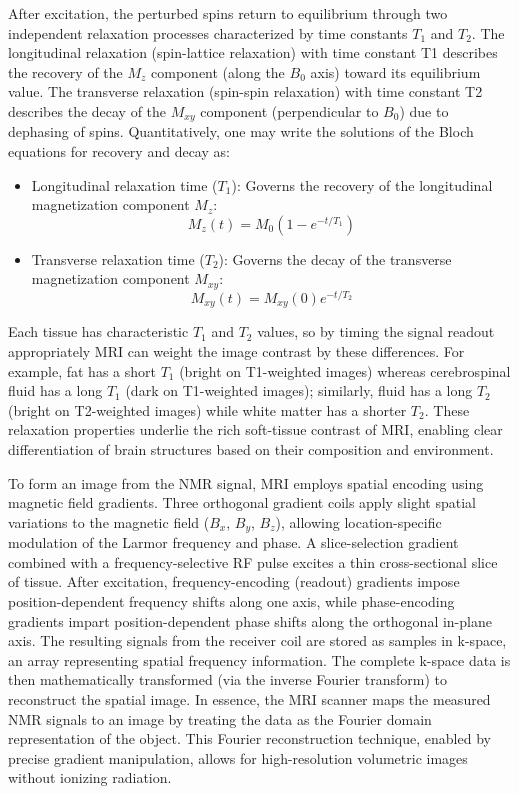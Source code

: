 After excitation, the perturbed spins return to equilibrium through two independent relaxation processes characterized by time constants $T_1$ and $T_2$. The longitudinal relaxation (spin-lattice relaxation) with time constant T1 describes the recovery of the $M_z$ component (along the $B_0$ axis) toward its equilibrium value. The transverse relaxation (spin-spin relaxation) with time constant T2 describes the decay of the $M_{xy}$ component (perpendicular to $B_0$) due to dephasing of spins. Quantitatively, one may write the solutions of the Bloch equations for recovery and decay as:
\begin{itemize}
    \item Longitudinal relaxation time (\(T_1\)): Governs the recovery of the longitudinal magnetization component \(M_z\):
    \begin{equation}
    M_z(t) = M_0 \left(1 - e^{-t/T_1}\right)
    \end{equation}
    
    \item Transverse relaxation time (\(T_2\)): Governs the decay of the transverse magnetization component \(M_{xy}\):
    \begin{equation}
    M_{xy}(t) = M_{xy}(0) e^{-t/T_2}
    \end{equation}
\end{itemize}
Each tissue has characteristic $T_1$ and $T_2$ values, so by timing the signal readout appropriately MRI can weight the image contrast by these differences. For example, fat has a short $T_1$ (bright on T1-weighted images) whereas cerebrospinal fluid has a long $T_1$ (dark on T1-weighted images); similarly, fluid has a long $T_2$ (bright on T2-weighted images) while white matter has a shorter $T_2$. These relaxation properties underlie the rich soft-tissue contrast of MRI, enabling clear differentiation of brain structures based on their composition and environment. 

To form an image from the NMR signal, MRI employs spatial encoding using magnetic field gradients. Three orthogonal gradient coils apply slight spatial variations to the magnetic field ($B_x$, $B_y$, $B_z$), allowing location-specific modulation of the Larmor frequency and phase. A slice-selection gradient combined with a frequency-selective RF pulse excites a thin cross-sectional slice of tissue. After excitation, frequency-encoding (readout) gradients impose position-dependent frequency shifts along one axis, while phase-encoding gradients impart position-dependent phase shifts along the orthogonal in-plane axis. The resulting signals from the receiver coil are stored as samples in k-space, an array representing spatial frequency information. The complete k-space data is then mathematically transformed (via the inverse Fourier transform) to reconstruct the spatial image. In essence, the MRI scanner maps the measured NMR signals to an image by treating the data as the Fourier domain representation of the object. This Fourier reconstruction technique, enabled by precise gradient manipulation, allows for high-resolution volumetric images without ionizing radiation.

